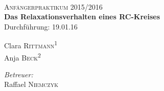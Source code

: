\begin{titlepage}
	\par
	\hfill
	\par
\begin{center}
\ \\
[5cm]	
	\textsc{\Huge Anfängerpraktikum 2015/2016} \\
[2cm]
	\Huge\textbf{Das Relaxationsverhalten eines RC-Kreises} \\
[1cm]
	{\large Durchführung: 19.01.16} \\
[4cm]
\begin{minipage}{0.4\textwidth}
	\begin{flushleft} \large
		Clara \textsc{Rittmann}\textsuperscript{1} \\
		Anja \textsc{Beck}\textsuperscript{2}
	\end{flushleft}
\end{minipage}
\hfill
\begin{minipage}{0.4\textwidth}
	\begin{flushright} \large
		\emph{Betreuer:} \\
		Raffael \textsc{Niemczyk}
	\end{flushright}
\end{minipage}
\end{center}
\end{titlepage}